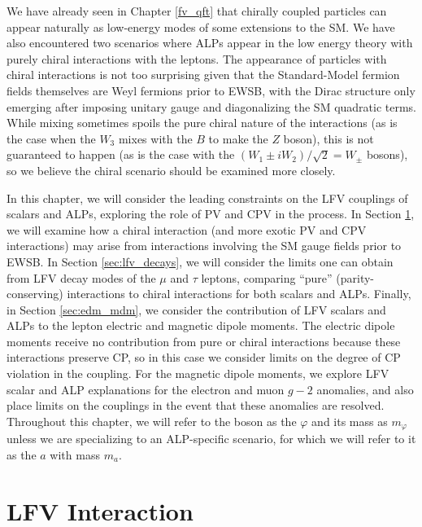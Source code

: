 We have already seen in Chapter \ref{fv_qft} that chirally coupled particles can appear naturally as low-energy modes of some extensions to the SM. We have also encountered two scenarios where ALPs appear in the low energy theory with purely chiral interactions with the leptons. The appearance of particles with chiral interactions is not too surprising given that the Standard-Model fermion fields themselves are Weyl fermions prior to EWSB, with the Dirac structure only emerging after imposing unitary gauge and diagonalizing the SM quadratic terms. While mixing sometimes spoils the pure chiral nature of the interactions (as is the case when the $W_3$ mixes with the $B$ to make the $Z$ boson), this is not guaranteed to happen (as is the case with the $(W_1\pm iW_2 )/\sqrt{2}= W_{\pm}$ bosons), so we believe the chiral scenario should be examined more closely.

In this chapter, we will consider the leading constraints on the LFV couplings of scalars and ALPs, exploring the role of PV and CPV in the process. In Section \ref{sec:lfv_int}, we will examine how a chiral interaction (and more exotic PV and CPV interactions) may arise from interactions involving the SM gauge fields prior to EWSB. In Section \ref{sec:lfv_decays}, we will consider the limits one can obtain from LFV decay modes of the $\mu$ and $\tau$ leptons, comparing ``pure'' (parity-conserving) interactions to chiral interactions for both scalars and ALPs. Finally, in Section \ref{sec:edm_mdm}, we consider the contribution of LFV scalars and ALPs to the lepton electric and magnetic dipole moments. The electric dipole moments receive no contribution from pure or chiral interactions because these interactions preserve CP, so in this case we consider limits on the degree of CP violation in the coupling. For the magnetic dipole moments, we explore LFV scalar and ALP explanations for the electron and muon $g-2$ anomalies, and also place limits on the couplings in the event that these anomalies are resolved. Throughout this chapter, we will refer to the boson as the $\varphi$ and its mass as $m_\varphi$ unless we are specializing to an ALP-specific scenario, for which we will refer to it as the $a$ with mass $m_a$.

\section{LFV Interaction}\label{sec:lfv_int}

